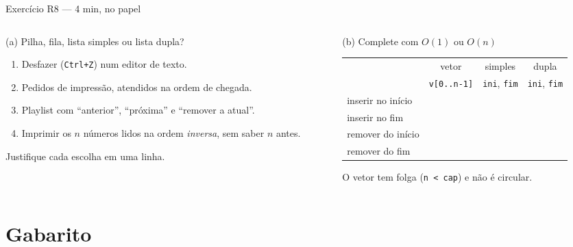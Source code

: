 \documentclass[aspectratio=169]{beamer}
\begin{document}
\begin{frame}{Exercício R8 --- 4 min, no papel}
  \begin{columns}[T]
    \begin{column}{0.47\textwidth}
      \begin{block}{(a) Pilha, fila, lista simples ou lista dupla?}
        \scriptsize
        \begin{enumerate}
          \item Desfazer (\texttt{Ctrl+Z}) num editor de texto.
          \item Pedidos de impressão, atendidos na ordem de chegada.
          \item Playlist com ``anterior'', ``próxima'' e ``remover a
            atual''.
          \item Imprimir os $n$ números lidos na ordem \emph{inversa}, sem
            saber $n$ antes.
        \end{enumerate}
        Justifique cada escolha em uma linha.
      \end{block}
    \end{column}
    \begin{column}{0.49\textwidth}
      \begin{block}{(b) Complete com $O(1)$ ou $O(n)$}
        \scriptsize
        \begin{tabular}{@{}lccc@{}}
          \toprule
          & vetor & simples & dupla \\
          & \texttt{v[0..n-1]} & \texttt{ini}, \texttt{fim} & \texttt{ini}, \texttt{fim} \\
          \midrule
          inserir no início & & & \\[0.15em]
          inserir no fim    & & & \\[0.15em]
          remover do início & & & \\[0.15em]
          remover do fim    & & & \\
          \bottomrule
        \end{tabular}
      \end{block}
      \scriptsize\textcolor{UFSGray}{O vetor tem folga (\texttt{n < cap})
      e não é circular.}
    \end{column}
  \end{columns}
\end{frame}

\section{Gabarito}
\end{document}
